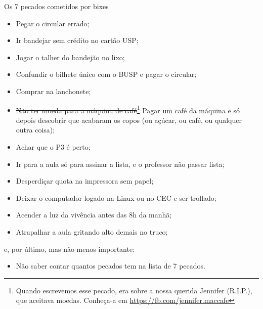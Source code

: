\begin{editorial}{Os 7 pecados cometidos por bixes}
\begin{itemize}
  \item Pegar o circular errado;
  \item Ir bandejar sem crédito no cartão USP;
  \item Jogar o talher do bandejão no lixo;
  \item Confundir o bilhete único com o BUSP e pagar o circular;
  \item Comprar na lanchonete;
  \item \sout{Não ter moeda para a máquina de café}\footnote{Quando escrevemos
    esse pecado, era sobre a nossa querida Jennifer (R.I.P.), que aceitava
    moedas. Conheça-a em \url{https://fb.com/jennifer.maccafe}} Pagar um café da
    máquina e só depois descobrir que acabaram os copos (ou açúcar, ou café,
    ou qualquer outra coisa);
  \item Achar que o P3 é perto;
  \item Ir para a aula só para assinar a lista, e o professor não passar lista;
  \item Desperdiçar quota na impressora sem papel;
  \item Deixar o computador logado na Linux ou no CEC e ser trollado;
  \item Acender a luz da vivência antes das 8h da manhã;
  \item Atrapalhar a aula gritando alto demais no truco;
\end{itemize}
e, por último, mas não menos importante:
\begin{itemize}
  \item Não saber contar quantos pecados tem na lista de 7 pecados.
\end{itemize}

\end{editorial}
